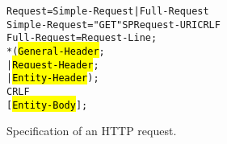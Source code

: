 \begin{figure}[ht]
		\begin{alltt}
			\hspace{1in} Request        = Simple-Request | Full-Request
			\hspace{1in} Simple-Request = "GET" SP Request-URI CRLF
			\hspace{1in} Full-Request   = Request-Line               ;
			\hspace{1in}                  *( \hl{General-Header}         ;
			\hspace{1in}                   | \hl{Request-Header}         ;
			\hspace{1in}                   | \hl{Entity-Header} )        ;
			\hspace{1in}                  CRLF
			\hspace{1in}                   [ \hl{Entity-Body} ]          ;
		\end{alltt}		
\caption{Specification of an HTTP request.}	
\label{fig:HTTP_request}
\end{figure}